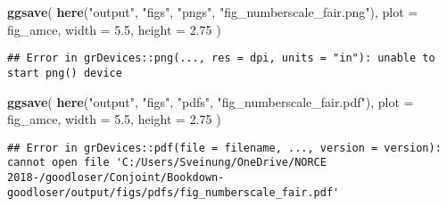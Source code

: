 \documentclass[]{book}
\newenvironment{Shaded}{\begin{snugshade}}{\end{snugshade}}
\newcommand{\KeywordTok}[1]{\textcolor[rgb]{0.13,0.29,0.53}{\textbf{#1}}}
\newcommand{\DataTypeTok}[1]{\textcolor[rgb]{0.13,0.29,0.53}{#1}}
\newcommand{\FloatTok}[1]{\textcolor[rgb]{0.00,0.00,0.81}{#1}}
\newcommand{\StringTok}[1]{\textcolor[rgb]{0.31,0.60,0.02}{#1}}
\newcommand{\NormalTok}[1]{#1}
\begin{document}
\begin{Shaded}
\begin{Highlighting}[]
\KeywordTok{ggsave}\NormalTok{(}
  \KeywordTok{here}\NormalTok{(}\StringTok{"output"}\NormalTok{, }\StringTok{"figs"}\NormalTok{, }\StringTok{"pngs"}\NormalTok{, }\StringTok{"fig_numberscale_fair.png"}\NormalTok{),}
  \DataTypeTok{plot =}\NormalTok{ fig_amce,}
  \DataTypeTok{width =} \FloatTok{5.5}\NormalTok{, }\DataTypeTok{height =} \FloatTok{2.75}
\NormalTok{)}
\end{Highlighting}
\end{Shaded}

\begin{verbatim}
## Error in grDevices::png(..., res = dpi, units = "in"): unable to start png() device
\end{verbatim}

\begin{Shaded}
\begin{Highlighting}[]
\KeywordTok{ggsave}\NormalTok{(}
  \KeywordTok{here}\NormalTok{(}\StringTok{"output"}\NormalTok{, }\StringTok{"figs"}\NormalTok{, }\StringTok{"pdfs"}\NormalTok{, }\StringTok{"fig_numberscale_fair.pdf"}\NormalTok{),}
  \DataTypeTok{plot =}\NormalTok{ fig_amce,}
  \DataTypeTok{width =} \FloatTok{5.5}\NormalTok{, }\DataTypeTok{height =} \FloatTok{2.75}
\NormalTok{)}
\end{Highlighting}
\end{Shaded}

\begin{verbatim}
## Error in grDevices::pdf(file = filename, ..., version = version): cannot open file 'C:/Users/Sveinung/OneDrive/NORCE 2018-/goodloser/Conjoint/Bookdown-goodloser/output/figs/pdfs/fig_numberscale_fair.pdf'
\end{verbatim}
\end{document}
